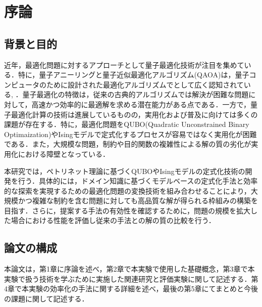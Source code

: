 \chapter{序論}
\label{chap:introduction}


\section{背景と目的}
近年，最適化問題に対するアプローチとして量子最適化技術が注目を集めている．特に，量子アニーリングと量子近似最適化アルゴリズム(QAOA)は，量子コンピュータのために設計された最適化アルゴリズムでとして広く認知されている\cite{qaoa}, \cite{quantum_annealing}．量子最適化の特徴は，従来の古典的アルゴリズムでは解決が困難な問題に対して，高速かつ効率的に最適解を求める潜在能力がある点である．一方で，量子最適化計算の技術は進展しているものの，実用化および普及に向けては多くの課題が存在する．特に，最適化問題をQUBO(Quadratic Unconstrained Binary Optimaization)やIsingモデルで定式化するプロセスが容易ではなく実用化が困難である．また，大規模な問題，制約や目的関数の複雑性による解の質の劣化が実用化における障壁となっている．

本研究では，ペトリネット理論に基づくQUBOやIsingモデルの定式化技術の開発を行う．具体的には，ドメイン知識に基づくモデルベースの定式化手法と効率的な探索を実現するための最適化問題の変換技術を組み合わせることにより，大規模かつ複雑な制約を含む問題に対しても高品質な解が得られる枠組みの構築を目指す．さらに，提案する手法の有効性を確認するために，問題の規模を拡大した場合における性能を評価し従来の手法との解の質の比較を行う．

\section{論文の構成}
本論文は，第1章に序論を述べ，第2章で本実験で使用した基礎概念，第3章で本実験で扱う技術を学ぶために実施した関連研究と評価実験に関して記述する．第4章で本実験の効率化の手法に関する詳細を述べ，最後の第5章にてまとめと今後の課題に関して記述する．
